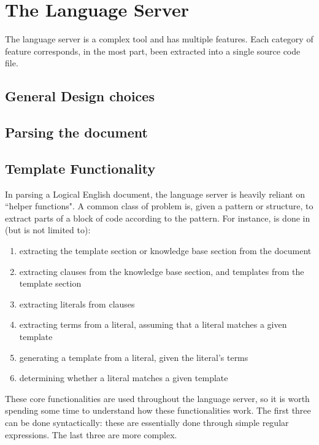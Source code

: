 \documentclass[../main.tex]{subfiles}
\begin{document}
\section{The Language Server}
The language server is a complex tool and has multiple features. Each category of feature corresponds, in the most part, been extracted into a single source code file. 


\subsection{General Design choices}


\subsection{Parsing the document}


\subsection{Template Functionality}
In parsing a Logical English document, the language server is heavily reliant on ``helper functions". A common class of problem is, given a pattern or structure, to extract parts of a block of code according to the pattern. For instance, is done in (but is not limited to):
\begin{enumerate}
    \item extracting the template section or knowledge base section from the document
    \item extracting clauses from the knowledge base section, and templates from the template section
    \item extracting literals from clauses
    \item extracting terms from a literal, assuming that a literal matches a given template
    \item generating a template from a literal, given the literal's terms
    \item determining whether a literal matches a given template
\end{enumerate}
These core functionalities are used throughout the language server, so it is worth spending some time to understand how these functionalities work. The first three can be done syntactically: these are essentially done through simple regular expressions. The last three are more complex.
\end{document}
